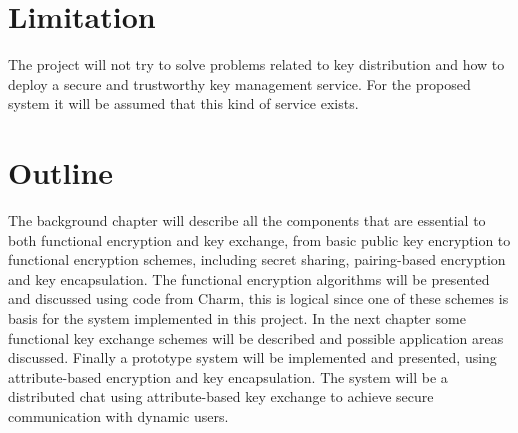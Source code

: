 \section{Limitation}\label{sec:limitations}
The project will not try to solve problems related to key distribution and how to deploy a secure and trustworthy key management service. For the proposed system it will be assumed that this kind of service exists.

\section{Outline}\label{sec:outline}
The background chapter will describe all the components that are essential to both functional encryption and key exchange, from basic public key encryption to functional encryption schemes, including secret sharing, pairing-based encryption and key encapsulation. The functional encryption algorithms will be presented and discussed using code from Charm, this is logical since one of these schemes is basis for the system implemented in this project. In the next chapter some functional key exchange schemes will be described and possible application areas discussed. Finally a prototype system will be implemented and presented, using attribute-based encryption and key encapsulation. The system will be a distributed chat using attribute-based key exchange to achieve secure communication with dynamic users.
